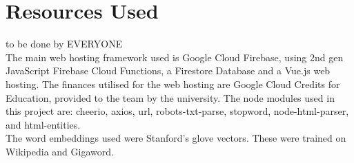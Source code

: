 \section{Resources Used}
to be done by EVERYONE\\
The main web hosting framework used is Google Cloud Firebase, using 2nd gen JavaScript Firebase Cloud Functions, a Firestore Database and a Vue.js web hosting.
The finances utilised for the web hosting are Google Cloud Credits for Education, provided to the team by the university.
The node modules used in this project are: cheerio, axios, url, robots-txt-parse, stopword, node-html-parser, and html-entities.\\
The word embeddings used were Stanford's glove vectors. These were trained on Wikipedia and Gigaword.


